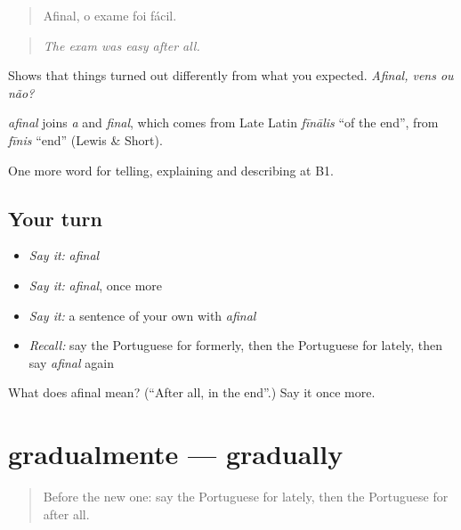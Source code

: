 \begin{quote}
Afinal, o exame foi fácil.
\end{quote}

\begin{quote}
\emph{The exam was easy after all.}
\end{quote}

Shows that things turned out differently from what you expected. \emph{Afinal, vens ou não?}

\begin{cousinweb}
\emph{afinal} joins \emph{a} and \emph{final}, which comes from Late Latin \emph{fīnālis} \textquotedblleft{}of the end\textquotedblright{}, from \emph{fīnis} \textquotedblleft{}end\textquotedblright{} (Lewis \& Short).
\end{cousinweb}

\begin{grammarlens}[title={What you've built}]
One more word for telling, explaining and describing at B1.
\end{grammarlens}

\subsection*{Your turn}
\begin{itemize}
\raggedright
  \item \emph{Say it:} \emph{afinal}
  \item \emph{Say it:} \emph{afinal}, once more
  \item \emph{Say it:} a sentence of your own with \emph{afinal}
  \item \emph{Recall:} say the Portuguese for formerly, then the Portuguese for lately, then say \emph{afinal} again
\end{itemize}

\begin{tcolorbox}[breakable,colback=teal!4,colframe=teal!35!black,title={Before you move on}]
What does afinal mean? (\textquotedblleft{}After all, in the end\textquotedblright{}.) Say it once more.
\end{tcolorbox}
\section[gradualmente]{gradualmente — gradually}

\label{lesson:PT-C274-gradualmente}



\begin{quote}
Before the new one: say the Portuguese for lately, then the Portuguese for after all.
\end{quote}

